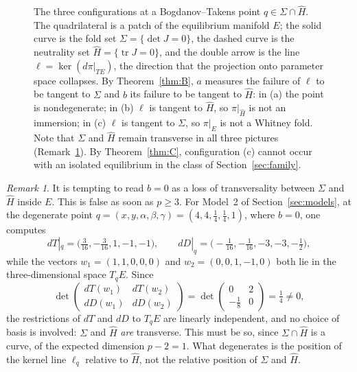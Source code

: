 \documentclass[12pt]{article}
\theoremstyle{plain}
\theoremstyle{definition}
\theoremstyle{remark}
\newtheorem{remark}[theorem]{Remark}
\newcommand{\tr}{\operatorname{tr}}
\DeclareMathOperator{\dt}{det}
\newcommand{\Hh}{\widehat{H}}
\begin{document}
\begin{figure}[ht]
\begin{tikzpicture}[line cap=round,>=latex,scale=0.87]
		\end{tikzpicture}
		\caption{The three configurations at a Bogdanov--Takens point
			$q\in\Sigma\cap\Hh$.  The quadrilateral is a patch of the equilibrium
			manifold $E$; the solid curve is the fold set $\Sigma=\{\dt J=0\}$, the
			dashed curve is the neutrality set $\Hh=\{\tr J=0\}$, and the
			double arrow is the line $\ell=\ker(d\pi|_{TE})$, the direction that
			the projection onto parameter space collapses.  By
			Theorem~\ref{thm:B}, $a$ measures the failure of $\ell$ to be tangent
			to $\Sigma$ and $b$ its failure to be tangent to $\Hh$: in (a) the
			point is nondegenerate; in (b) $\ell$ is tangent to $\Hh$, so
			$\pi|_{\Hh}$ is not an immersion; in (c) $\ell$ is tangent to
			$\Sigma$, so $\pi|_{E}$ is not a Whitney fold.  Note that $\Sigma$ and
			$\Hh$ remain transverse in all three pictures
			(Remark~\ref{rem:nottransversality}).  By Theorem~\ref{thm:C},
			configuration (c) cannot occur with an isolated equilibrium in the
			class of Section~\ref{sec:family}.}
		\label{fig:kernel}
	\end{figure}
	
	\begin{remark}\label{rem:nottransversality}
		It is tempting to read $b=0$ as a loss of transversality between
		$\Sigma$ and $\Hh$ inside $E$.  This is false as soon as $p\geq3$.  For
		Model~2 of Section~\ref{sec:models}, at the degenerate point
		$q=(x,y,\alpha,\beta,\gamma)=(4,4,\tfrac14,\tfrac14,1)$, where $b=0$,
		one computes
		\[
		dT|_{q}=\bigl(\tfrac3{16},-\tfrac3{16},1,-1,-1\bigr),
		\qquad
		dD|_{q}=\bigl(-\tfrac1{16},-\tfrac1{16},-3,-3,-\tfrac12\bigr),
		\]
		while the vectors $w_{1}=(1,1,0,0,0)$ and $w_{2}=(0,0,1,-1,0)$ both
		lie in the three-dimensional space $T_{q}E$.  Since
		\[
		\det\begin{pmatrix}
			dT(w_{1})&dT(w_{2})\\[2pt] dD(w_{1})&dD(w_{2})
		\end{pmatrix}
		=\det\begin{pmatrix}0&2\\[2pt] -\tfrac18&0\end{pmatrix}
		=\tfrac14\neq0 ,
		\]
		the restrictions of $dT$ and $dD$ to $T_{q}E$ are linearly
		independent, and no choice of basis is involved: $\Sigma$ and $\Hh$
		\emph{are} transverse.  This must be so, since $\Sigma\cap\Hh$ is a curve, of the
		expected dimension $p-2=1$.  What degenerates is the position of the
		kernel line $\ell_{q}$ relative to $\Hh$, not the relative position of
		$\Sigma$ and $\Hh$.
	\end{remark}
	
\end{document}
